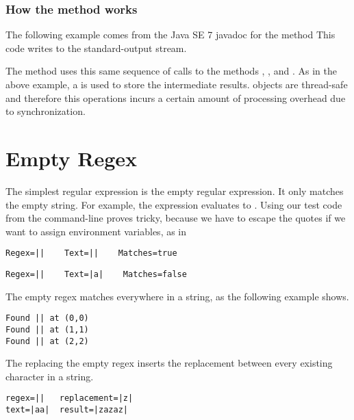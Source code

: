 \subsubsection{How the  method works }\label{section:regex-replaceAll}

The following example comes from the Java SE 7 javadoc for the
 method
%
%
This code writes  to the standard-output stream.

The  method uses this same sequence of calls to
the methods , , and .
As in the above example, a  is used to store 
the intermediate results.
 objects are thread-safe and therefore this operations
incurs a certain amount of processing overhead due to synchronization.


\section{Empty Regex}\label{section:regex-empty}

The simplest regular expression is the empty regular expression.  It
only matches the empty string.  For example, the expression
 evaluates to
.  Using our test code from the command-line proves tricky,
because we have to escape the quotes if we want to assign environment
variables, as in 
%
\begin{verbatim}
Regex=||    Text=||    Matches=true
\end{verbatim}
%
\begin{verbatim}
Regex=||    Text=|a|    Matches=false
\end{verbatim}
The empty regex matches everywhere in a string, as the following example shows.
%
\begin{verbatim} 
Found || at (0,0)
Found || at (1,1)
Found || at (2,2)
\end{verbatim} 
The replacing the empty regex inserts the replacement between every
existing character in a string.
\begin{verbatim}
regex=||   replacement=|z|
text=|aa|  result=|zazaz|
\end{verbatim}

